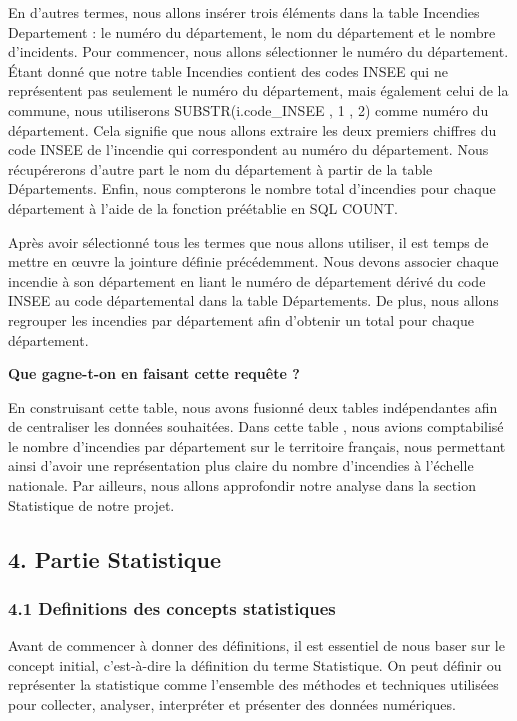 \documentclass[
]{article}
\begin{document}
En d'autres termes, nous allons insérer trois éléments dans la table
Incendies Departement : le numéro du département, le nom du département
et le nombre d'incidents. Pour commencer, nous allons sélectionner le
numéro du département. Étant donné que notre table Incendies contient
des codes INSEE qui ne représentent pas seulement le numéro du
département, mais également celui de la commune, nous utiliserons
SUBSTR(i.code\_INSEE , 1 , 2) comme numéro du département. Cela signifie
que nous allons extraire les deux premiers chiffres du code INSEE de
l'incendie qui correspondent au numéro du département. Nous récupérerons
d'autre part le nom du département à partir de la table Départements.
Enfin, nous compterons le nombre total d'incendies pour chaque
département à l'aide de la fonction préétablie en SQL COUNT.

Après avoir sélectionné tous les termes que nous allons utiliser, il est
temps de mettre en œuvre la jointure définie précédemment. Nous devons
associer chaque incendie à son département en liant le numéro de
département dérivé du code INSEE au code départemental dans la table
Départements. De plus, nous allons regrouper les incendies par
département afin d'obtenir un total pour chaque département.

\textbf{Que gagne-t-on en faisant cette requête ?}

En construisant cette table, nous avons fusionné deux tables
indépendantes afin de centraliser les données souhaitées. Dans cette
table , nous avions comptabilisé le nombre d'incendies par département
sur le territoire français, nous permettant ainsi d'avoir une
représentation plus claire du nombre d'incendies à l'échelle nationale.
Par ailleurs, nous allons approfondir notre analyse dans la section
Statistique de notre projet.

\subsection{4. Partie Statistique}\label{partie-statistique}

\subsubsection{4.1 Definitions des concepts
statistiques}\label{definitions-des-concepts-statistiques}

Avant de commencer à donner des définitions, il est essentiel de nous
baser sur le concept initial, c'est-à-dire la définition du terme
Statistique. On peut définir ou représenter la statistique comme
l'ensemble des méthodes et techniques utilisées pour collecter,
analyser, interpréter et présenter des données numériques.
\end{document}
